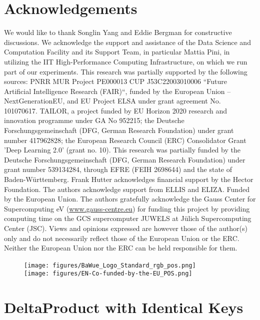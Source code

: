 \documentclass{article} %
\begin{document}
\section*{Acknowledgements}
We would like to thank Songlin Yang and Eddie Bergman for constructive discussions. We acknowledge the support and assistance of the Data Science and Computation Facility and its Support Team, in particular Mattia Pini, in utilizing the IIT High-Performance Computing Infrastructure, on which we run part of our experiments.
This research was partially supported by the following sources:  PNRR MUR Project PE000013 CUP J53C22003010006 “Future Artificial Intelligence Research (FAIR)“, funded by the European Union – NextGenerationEU, and EU Project ELSA under grant agreement No. 101070617.
TAILOR, a project funded by EU Horizon 2020 research and innovation programme under GA No 952215; the Deutsche Forschungsgemeinschaft (DFG, German Research Foundation) under grant number 417962828; the European Research Council (ERC) Consolidator Grant 'Deep Learning 2.0' (grant no. 10). This research was partially funded by the Deutsche Forschungsgemeinschaft (DFG, German Research Foundation) under grant number 539134284, through EFRE (FEIH 2698644) and the state of Baden-Württemberg. Frank Hutter acknowledges financial support by the Hector Foundation. The authors acknowledge support from ELLIS and ELIZA. Funded by the European Union. The authors gratefully acknowledge the Gauss Center for Supercomputing eV (\url{www.gauss-centre.eu}) for funding this project by providing computing time on the GCS supercomputer JUWELS at Jülich Supercomputing Center (JSC). Views and opinions expressed are however those of the author(s) only and do not necessarily reflect those of the European Union or the ERC. Neither the European Union nor the ERC can be held responsible for them.
\vspace{-5pt}
\begin{figure}[h]
\begin{center}
\texttt{[image: figures/BaWue\_Logo\_Standard\_rgb\_pos.png]} ~~~ \texttt{[image: figures/EN-Co-funded-by-the-EU\_POS.png]} 
\end{center}
\end{figure}



\newpage
\appendix
\section{DeltaProduct with Identical Keys}
\end{document}

